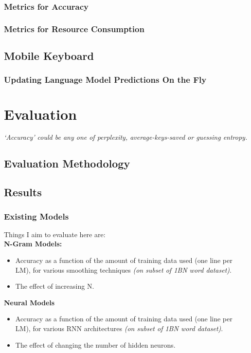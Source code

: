 \documentclass[a4paper, 12pt]{report}
\newcommand{\tbf}[1]{\textbf{#1}}
\newcommand{\tit}[1]{\textit{#1}}
\begin{document}
\subsection{Metrics for Accuracy}
\subsection{Metrics for Resource Consumption}
\section{Mobile Keyboard}
\subsection{Updating Language Model Predictions On the Fly}

\chapter{Evaluation}
\tit{`Accuracy' could be any one of perplexity, average-keys-saved or guessing entropy.}
\section{Evaluation Methodology}
\section{Results}
\subsection{Existing Models}
Things I aim to evaluate here are: \\
\tbf{N-Gram Models:}
\begin{itemize}
\item
	Accuracy as a function of the amount of training data used (one line per LM), for various smoothing techniques \tit{(on subset of 1BN word dataset)}.
\item
	The effect of increasing N.
\end{itemize}

\tbf{Neural Models}
\begin{itemize}
\item
	Accuracy as a function of the amount of training data used (one line per LM), for various RNN architectures \tit{(on subset of 1BN word dataset)}.
\item
	The effect of changing the number of hidden neurons.
\end{itemize}
\end{document}
